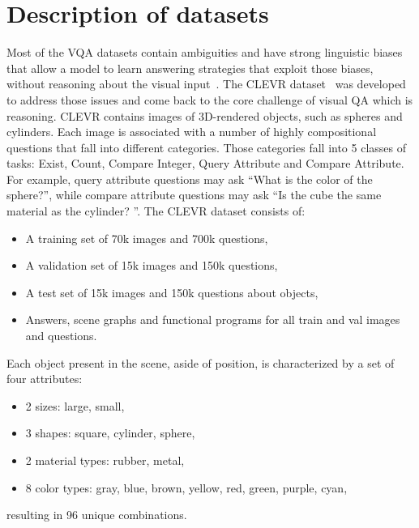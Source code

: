 \appendix

\section{Description of datasets}

Most of the VQA datasets contain ambiguities and have strong linguistic biases that allow a model to learn answering strategies that exploit those biases, without reasoning about the visual input~\cite{Santoro2017ASN}.
The CLEVR dataset~\cite{johnson2017clevr} was developed to address those issues and come back to the core challenge of visual QA which is reasoning.
CLEVR contains images of 3D-rendered objects, such as spheres and cylinders.
Each image is associated with a number of highly compositional questions that fall into different categories.
Those categories fall into 5 classes of tasks: Exist, Count, Compare Integer, Query Attribute and Compare Attribute. 
For example, query attribute questions may ask “What is the color of the sphere?”, while compare attribute questions may ask “Is the cube the same material as the cylinder? ”.
The CLEVR dataset consists of:
\begin{itemize}
\item 	A training set of 70k images and 700k questions,
\item	A validation set of 15k images and 150k questions,
\item	A test  set of 15k images and 150k questions about objects,
\item	Answers, scene graphs and functional programs for all train and val images and questions.
\end{itemize}
Each object present in the scene, aside of position, is characterized by a set of four attributes:
\begin{itemize}
\item 2 sizes: large, small,
\item 3 shapes: square, cylinder, sphere,
\item 2 material types: rubber, metal,
\item 8 color types: gray, blue, brown, yellow, red, green, purple, cyan,
\end{itemize}
resulting in 96 unique combinations.

